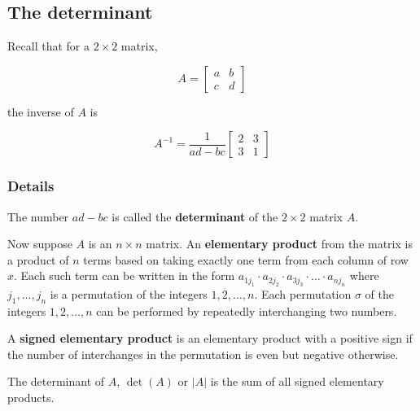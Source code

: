 \documentclass[12pt,a4paper]{article}
\theoremstyle{regla}
\theoremstyle{remark}
\theoremstyle{definition}
\theoremstyle{nonumberbreak}
\begin{document}
\subsection{The determinant}
\begin{fbox}
\begin{minipage}{0.97\textwidth}
Recall that for a $2 \times 2$ matrix, 

$$A=
\begin{bmatrix}
a & b  \\
c & d 
\end{bmatrix}$$

the inverse of $A$ is 

$$A^{-1}=
\frac{1}{ad-bc}
\begin{bmatrix}
2 & 3  \\
3 & 1 
\end{bmatrix}$$
\end{minipage}
\end{fbox}
\subsubsection{Details}
\begin{defn}
The number $ad-bc$ is called the {\bf determinant} of the $2 \times 2$ matrix $A$.
\end{defn}
\begin{defn}
Now suppose $A$ is an $n \times n$ matrix. An {\bf elementary product} from the matrix is a product of $n$ terms based on taking  exactly one term from each column of row $x$. Each such term can be written in the form 
$a_{1j_1} \cdot a_{2j_2} \cdot a_{3j_3} \cdot \ldots \cdot a_{nj_n}$
where $j_1, \ldots , j_n$ is a permutation of the integers $1,2, \ldots , n$. Each permutation $\sigma$ of the integers $1,2,\ldots,n$ can be performed by repeatedly interchanging two numbers. 
\end{defn}

\begin{defn}
A {\bf signed elementary product} is an elementary product with a positive sign if the number of interchanges in the permutation is even but negative otherwise.
\end{defn}

The determinant of $A$, $\det(A)$ or $\vert A \vert$ is the sum of all signed elementary products.
\end{document}
